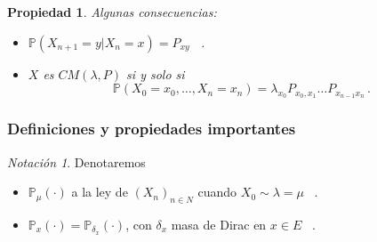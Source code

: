 \documentclass[letterpaper,11pt]{article} %
\theoremstyle{defbreak}
\theoremstyle{propbreak}
\newtheorem{property}{Propiedad}[subsection]
\theoremstyle{remark}
\newtheorem*{notation}{Notación}
\theoremstyle{break}
\def\P{\mathbb{P}}
\def\xcm{(X_n)_{n\in N}}
\begin{document}
\begin{property}
Algunas consecuencias:
\begin{itemize}
    \item $\P(X_{n+1}=y|X_n=x) = P_{xy}$ \, .
    \item $X$ es $CM(\lambda,P)$ si y solo si $$\P(X_0=x_0,\dots,X_n=x_n)=\lambda_{x_0}P_{x_0,x_1}\dots P_{x_{n-1}x_n}\, .$$
\end{itemize}
\end{property}

\subsubsection{Definiciones y propiedades importantes}
\begin{notation}
Denotaremos
\begin{itemize}
    \item $\P_\mu(\cdot)$ a la ley de $\xcm$ cuando $X_0\sim\lambda=\mu$ \, .
    \item $\P_x(\cdot)=\P_{\delta_x}(\cdot)$, con $\delta_x$ masa de Dirac en $x\in E$ \, .
\end{itemize}
\end{notation}
\end{document}
